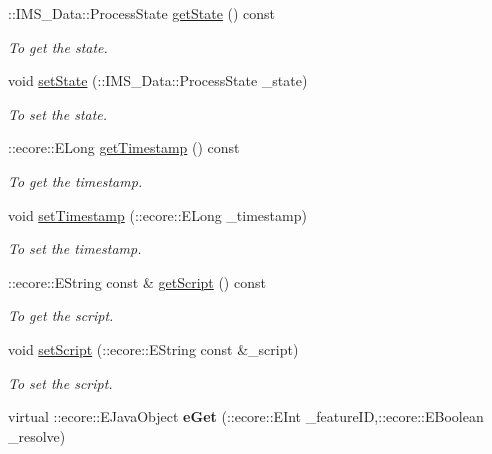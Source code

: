 \begin{DoxyCompactItemize}
::IMS\_\-Data::ProcessState \hyperlink{classIMS__Data_1_1Process_a3be9953df9dd84730641c4dace88e13f}{getState} () const 
\begin{DoxyCompactList}\small\item\em To get the state. \item\end{DoxyCompactList}\item 
void \hyperlink{classIMS__Data_1_1Process_a8638b146396a35cb617d437136cd8322}{setState} (::IMS\_\-Data::ProcessState \_\-state)
\begin{DoxyCompactList}\small\item\em To set the state. \item\end{DoxyCompactList}\item 
::ecore::ELong \hyperlink{classIMS__Data_1_1Process_a5513870cd5dcc9cc8589556621e0c0fd}{getTimestamp} () const 
\begin{DoxyCompactList}\small\item\em To get the timestamp. \item\end{DoxyCompactList}\item 
void \hyperlink{classIMS__Data_1_1Process_af065794b53c5438ff89cc15bc47bbc6b}{setTimestamp} (::ecore::ELong \_\-timestamp)
\begin{DoxyCompactList}\small\item\em To set the timestamp. \item\end{DoxyCompactList}\item 
::ecore::EString const \& \hyperlink{classIMS__Data_1_1Process_ad3cbb5dcda97a76abe300063920a01e4}{getScript} () const 
\begin{DoxyCompactList}\small\item\em To get the script. \item\end{DoxyCompactList}\item 
void \hyperlink{classIMS__Data_1_1Process_aee747f9e6dec77b5c5d98abd1e7b907d}{setScript} (::ecore::EString const \&\_\-script)
\begin{DoxyCompactList}\small\item\em To set the script. \item\end{DoxyCompactList}\item 
\hypertarget{classIMS__Data_1_1Process_abba279aafb488b450ecfa077b06a81f6}{
virtual ::ecore::EJavaObject {\bfseries eGet} (::ecore::EInt \_\-featureID,::ecore::EBoolean \_\-resolve)}
\label{classIMS__Data_1_1Process_abba279aafb488b450ecfa077b06a81f6}


\end{DoxyCompactItemize}
